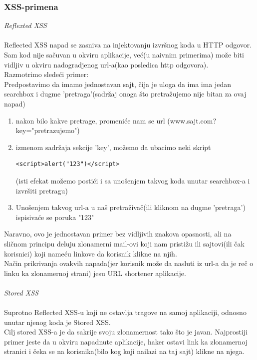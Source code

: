 \documentclass[a4paper]{article}
\begin{document}
\subsubsection{XSS-primena}
\textit{Reflexted XSS}\\\\
Reflected XSS napad se zasniva na injektovanju izvr\v{s}nog koda u HTTP odgovor. Sam kod nije sa\v{c}uvan u okviru aplikacije, ve\'{c}(u naivnim primerima) mo\v{z}e biti vidljiv u okviru nadogradjenog url-a(kao posledica http odgovora).\\
Razmotrimo slede\'{c}i primer:\\
Predpostavimo da imamo jednostavan sajt, \v{c}ija je uloga da ima ima jedan searchbox i dugme 'pretraga'(sadr\v{z}aj onoga \v{s}to pretra\v{z}ujemo nije bitan za ovaj napad)
\begin{enumerate}
\item nakon bilo kakve pretrage, promeni\'{c}e nam se url (www.sajt.com?key="pretrazujemo")
\item izmenom sadr\v{z}aja sekcije 'key', mo\v{z}emo da ubacimo neki skript
\begin{lstlisting}
<script>alert("123")</script>
\end{lstlisting}
(isti efekat mo\v{z}emo posti\'{c}i i sa uno\v{s}enjem takvog koda unutar searchbox-a i izvr\v{s}iti pretragu)
\item Uno\v{s}enjem takvog url-a u na\v{s} pretra\v{z}iva\v{c}(ili kliknom na dugme 'pretraga') ispisiva\'{c}e se poruka "123"

\end{enumerate}
Naravno, ovo je jednostavan primer bez vidljivih znakova opasnosti, ali na sli\v{c}nom principu deluju zlonamerni mail-ovi koji nam pristi\v{z}u ili sajtovi(ili \v{c}ak korisnici) koji name\'{c}u linkove da korisnik klikne na njih.\\
Na\v{c}in prikrivanja ovakvih napada(jer korisnik mo\v{z}e da nasluti iz url-a da je re\v{c} o linku ka zlonamernoj strani) jesu URL shortener aplikacije.\\\\
\textit{Stored XSS}\\\\
Suprotno Reflected XSS-u koji ne ostavlja tragove na samoj aplikaciji, odnosno unutar njenog koda je Stored XSS.\\ Cilj stored XSS-a je da sakrije svoju zlonamernost tako \v{s}to je javan. Najprostiji primer jeste da u okviru napadnute aplikacije, haker ostavi link ka zlonamernoj stranici i \v{c}eka se na korisnika(bilo kog koji nailazi na taj sajt) klikne na njega.
\end{document}
